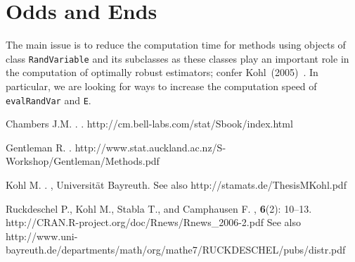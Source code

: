 \documentclass[11pt]{article}
\begin{document}
\section{Odds and Ends}
The main issue is to reduce the computation time for methods using
objects of class {\tt RandVariable} and its subclasses as these classes
play an important role in the computation of optimally robust
estimators; confer Kohl~(2005)~\cite{MK:05}.
In particular, we are looking for ways to increase the computation speed
of {\tt evalRandVar} and {\tt E}.
\begin{thebibliography}{8}

Chambers J.M. 
.
.
\newblock http://cm.bell-labs.com/stat/Sbook/index.html

Gentleman R.
.
\newblock http://www.stat.auckland.ac.nz/S-Workshop/Gentleman/Methods.pdf

Kohl M. 
. 
, Universit\"at Bayreuth. 
\newblock See also http://stamats.de/ThesisMKohl.pdf

Ruckdeschel P., Kohl M., Stabla T., and Camphausen F. 
, {\bf 6}(2): 10--13.
\newblock http://CRAN.R-project.org/doc/Rnews/Rnews\_2006-2.pdf
\newblock See also {http://www.uni-bayreuth.de/departments/math/org/mathe7/RUCKDESCHEL/pubs/distr.pdf}

\end{thebibliography}
\end{document}

